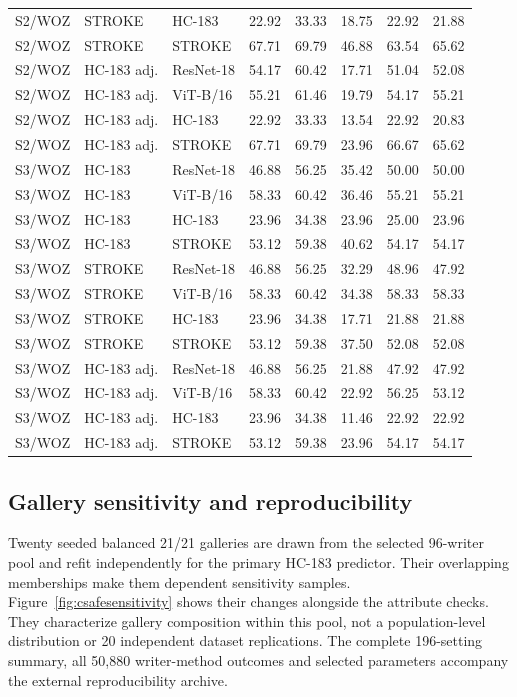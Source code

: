 \documentclass[10pt,a4paper]{article}
\begin{document}
\begin{longtable}{lllrrrrr}
S2/WOZ & STROKE & HC-183 & 22.92 & 33.33 & 18.75 & 22.92 & 21.88 \\
S2/WOZ & STROKE & STROKE & 67.71 & 69.79 & 46.88 & 63.54 & 65.62 \\
S2/WOZ & HC-183 adj. & ResNet-18 & 54.17 & 60.42 & 17.71 & 51.04 & 52.08 \\
S2/WOZ & HC-183 adj. & ViT-B/16 & 55.21 & 61.46 & 19.79 & 54.17 & 55.21 \\
S2/WOZ & HC-183 adj. & HC-183 & 22.92 & 33.33 & 13.54 & 22.92 & 20.83 \\
S2/WOZ & HC-183 adj. & STROKE & 67.71 & 69.79 & 23.96 & 66.67 & 65.62 \\
S3/WOZ & HC-183 & ResNet-18 & 46.88 & 56.25 & 35.42 & 50.00 & 50.00 \\
S3/WOZ & HC-183 & ViT-B/16 & 58.33 & 60.42 & 36.46 & 55.21 & 55.21 \\
S3/WOZ & HC-183 & HC-183 & 23.96 & 34.38 & 23.96 & 25.00 & 23.96 \\
S3/WOZ & HC-183 & STROKE & 53.12 & 59.38 & 40.62 & 54.17 & 54.17 \\
S3/WOZ & STROKE & ResNet-18 & 46.88 & 56.25 & 32.29 & 48.96 & 47.92 \\
S3/WOZ & STROKE & ViT-B/16 & 58.33 & 60.42 & 34.38 & 58.33 & 58.33 \\
S3/WOZ & STROKE & HC-183 & 23.96 & 34.38 & 17.71 & 21.88 & 21.88 \\
S3/WOZ & STROKE & STROKE & 53.12 & 59.38 & 37.50 & 52.08 & 52.08 \\
S3/WOZ & HC-183 adj. & ResNet-18 & 46.88 & 56.25 & 21.88 & 47.92 & 47.92 \\
S3/WOZ & HC-183 adj. & ViT-B/16 & 58.33 & 60.42 & 22.92 & 56.25 & 53.12 \\
S3/WOZ & HC-183 adj. & HC-183 & 23.96 & 34.38 & 11.46 & 22.92 & 22.92 \\
S3/WOZ & HC-183 adj. & STROKE & 53.12 & 59.38 & 23.96 & 54.17 & 54.17 \\
\bottomrule
\end{longtable}

\subsection{Gallery sensitivity and reproducibility}
Twenty seeded balanced 21/21 galleries are drawn from the selected 96-writer pool and refit independently for the primary HC-183 predictor. Their overlapping memberships make them dependent sensitivity samples. Figure~\ref{fig:csafesensitivity} shows their changes alongside the attribute checks. They characterize gallery composition within this pool, not a population-level distribution or 20 independent dataset replications. The complete 196-setting summary, all 50,880 writer-method outcomes and selected parameters accompany the external reproducibility archive.
\end{document}
